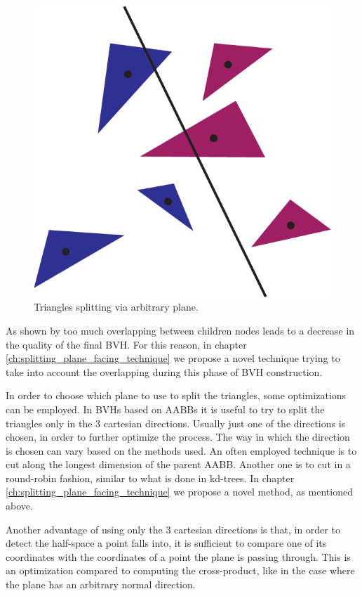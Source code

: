 \documentclass{PoliMi_MasterThesis}
\begin{document}
\begin{figure}[H]
    \centering
    \includegraphics[width=\textwidth*\real{0.4}]{Images/triangle_splitting_arbitrary.png}
    \caption{Triangles splitting via arbitrary plane.}
    \label{fig:triangles_splitting}
\end{figure}

As shown by \cite{bvh_overlapping_metric} too much overlapping between children nodes leads to a decrease in the quality of the final BVH. For this reason, in chapter \ref{ch:splitting_plane_facing_technique} we propose a novel technique trying to take into account the overlapping during this phase of BVH construction.

In order to choose which plane to use to split the triangles, some optimizations can be employed. In BVHs based on AABBs it is useful to try to split the triangles only in the 3 cartesian directions. Usually just one of the directions is chosen, in order to further optimize the process. The way in which the direction is chosen can vary based on the methods used. An often employed technique is to cut along the longest dimension of the parent AABB. Another one is to cut in a round-robin fashion, similar to what is done in kd-trees. In chapter \ref{ch:splitting_plane_facing_technique} we propose a novel method, as mentioned above.

Another advantage of using only the 3 cartesian directions is that, in order to detect the half-space a point falls into, it is sufficient to compare one of its coordinates with the coordinates of a point the plane is passing through. This is an optimization compared to computing the cross-product, like in the case where the plane has an arbitrary normal direction.
\end{document}
